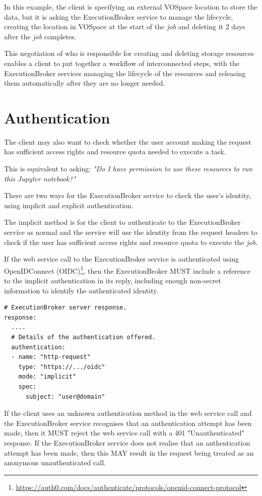 \documentclass[11pt,a4paper]{ivoa}
\newcommand{\webservice} {web service}
\newcommand{\vospace} {VOSpace}
\newcommand{\execbrokerclass} {ExecutionBroker}
\newcommand{\jupyternotebook} {Jupyter notebook}
\newcommand{\footurl}[1] {\footnote{\url{#1}}}
\newcommand{\job} {\textit{job}}
\newcommand{\task} {task}
\begin{document}
In this example, the client is specifying an external \vospace{} location to store the data,
but it is asking the \execbrokerclass{} service to manage the lifecycle, creating the location
in \vospace{} at the start of the \job{} and deleting it 2 days after the \job{} completes.

This negotiation of who is responsible for creating and deleting storage resources
enables a client to put together a workflow of interconnected steps, with the
\execbrokerclass{} services
managing the lifecycle of the resources and releasing them automatically after they
are no longer needed.

\section{Authentication}
\label{authentication}

The client may also want to check whether the user account making the request
has sufficient access rights and resource quota needed to execute a \task{}.

This is equivalent to asking:
\textit{"Do I have permission to use these resources to run this \jupyternotebook{}?"}

There are two ways for the \execbrokerclass{} service to check the user's identity,
using implicit and explicit authentication.

The implicit method is for the client to authenticate to the \execbrokerclass{} service
as normal and the service will use the identity from the request headers to check if the
user has sufficient access rights and resource quota to execute the \job{}.

If the \webservice{} call to the \execbrokerclass{} service is authenticated
using OpenIDConnect
(OIDC)\footurl{https://auth0.com/docs/authenticate/protocols/openid-connect-protocol},
then the \execbrokerclass{} MUST include a reference to the implicit
authentication in its reply, including enough non-secret
information to identify the authenticated identity.

\begin{lstlisting}[]
# ExecutionBroker server response.
response:
  ....
  # Details of the authentication offered.
  authentication:
  - name: "http-request"
    type: "https://.../oidc"
    mode: "implicit"
    spec:
      subject: "user@domain"
\end{lstlisting}

If the client uses an unknown authentication method in the \webservice{} call and
the \execbrokerclass{} service recognises that an anthentication attempt has been made,
then it MUST reject the \webservice{} call with a 401 "Unauthenticated" response.
If the \execbrokerclass{} service does not realise that an anthentication attempt has been made,
then this MAY result in the request being treated as an anonymous unauthenticated call.
\end{document}
